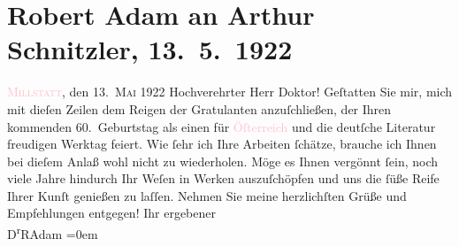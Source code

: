 

               \section[Robert Adam an Arthur Schnitzler, 13. 5. 1922]{ Robert Adam an Arthur Schnitzler, 13. 5. 1922}\nopagebreak{}\rehead{ }\normalsize\beginnumbering{} \toendnotes[C]{\smallbreak\pagebreak[2]} 
\pstart
           \raggedleft{}{\pb}\textsc{\textcolor{pink}{Millstatt}{}\ledrightnote{\textcolor{pink}{Millstatt}}}, den 13. \textsc{Mai} 1922\pend
           \pstart\center{}Hochverehrter Herr Doktor!\pend\pstart
           Geſtatten Sie mir, mich mit dieſen Zeilen dem Reigen der Gratulanten
                    anzuſchließen, der Ihren kommenden 60. Geburtstag als einen für \textcolor{pink}{Öſterreich}{}\ledrightnote{\textcolor{pink}{Österreich}} und die deutſche Literatur freudigen Werktag
                    feiert. Wie ſehr ich Ihre Arbeiten ſchätze, brauche ich Ihnen bei dieſem Anlaß
                    wohl nicht zu wiederholen. Möge es Ihnen vergönnt ſein, {\pb}noch viele Jahre hindurch Ihr Weſen in Werken
                    auszuſchöpfen und uns die ſüße Reife Ihrer Kunſt genießen zu laſſen.\pend
           \pstart
           Nehmen Sie meine herzlichſten Grüße und Empfehlungen entgegen!\pend
           \pstart
           Ihr ergebener{\\[\baselineskip]}\spacefill\mbox{D\textsuperscript{r}RAdam}\pend
           \leftskip=0em{}\endnumbering{}  
      